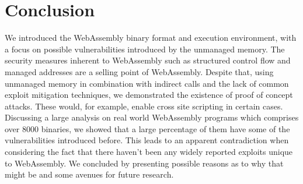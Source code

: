 \documentclass[sigconf]{acmart}
\begin{document}
\section{Conclusion}
We introduced the WebAssembly binary format and execution environment, with a focus on possible vulnerabilities introduced by the unmanaged memory. The security measures inherent to WebAssembly such as structured control flow and managed addresses are a selling point of WebAssembly. Despite that, using unmanaged memory in combination with indirect calls and the lack of common exploit mitigation techniques, we demonstrated the existence of proof of concept attacks. These would, for example, enable cross site scripting in certain cases. Discussing a large analysis on real world WebAssembly programs which comprises over 8000 binaries, we showed that a large percentage of them have some of the vulnerabilities introduced before. This leads to an apparent contradiction when considering the fact that there haven't been any widely reported exploits unique to WebAssembly. We concluded by presenting possible reasons as to why that might be and some avenues for future research. 




\end{document}
